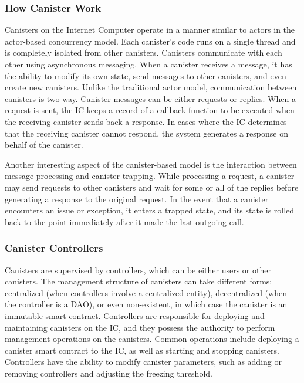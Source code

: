 \subsubsection{How Canister Work}

Canisters on the Internet Computer operate in a manner similar to actors in the actor-based concurrency model. Each canister's code runs on a single thread and is completely isolated from other canisters. Canisters communicate with each other using asynchronous messaging. When a canister receives a message, it has the ability to modify its own state, send messages to other canisters, and even create new canisters. Unlike the traditional actor model, communication between canisters is two-way. Canister messages can be either requests or replies. When a request is sent, the \ac{IC} keeps a record of a callback function to be executed when the receiving canister sends back a response. In cases where the \ac{IC} determines that the receiving canister cannot respond, the system generates a response on behalf of the canister.

Another interesting aspect of the canister-based model is the interaction between message processing and canister trapping. While processing a request, a canister may send requests to other canisters and wait for some or all of the replies before generating a response to the original request. In the event that a canister encounters an issue or exception, it enters a trapped state, and its state is rolled back to the point immediately after it made the last outgoing call.

\subsubsection{Canister Controllers}
Canisters are supervised by controllers, which can be either users or other canisters. The management structure of canisters can take different forms: centralized (when controllers involve a centralized entity), decentralized (when the controller is a \ac{DAO}), or even non-existent, in which case the canister is an immutable smart contract. Controllers are responsible for deploying and maintaining canisters on the \ac{IC}, and they possess the authority to perform management operations on the canisters. Common operations include deploying a canister smart contract to the \ac{IC}, as well as starting and stopping canisters. Controllers have the ability to modify canister parameters, such as adding or removing controllers and adjusting the freezing threshold.

